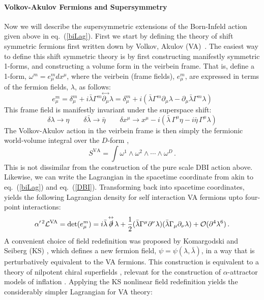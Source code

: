 \documentclass[11pt,letter]{article}
\def\eqn#1{eq.~(\ref{#1})}
\begin{document}
\paragraph{Volkov-Akulov Fermions and Supersymmetry}
Now we will describe the supersymmetric extensions of the Born-Infeld action given above in \eqn{biLag}. First we start by defining the theory of shift symmetric fermions first written down by Volkov, Akulov (VA)~\cite{Volkov:1973ix}. The easiest way to define this shift symmetric theory is by first constructing manifestly symmetric 1-forms, and constructing a volume form in the veirbein frame. That is, define a 1-form, $ \omega^m = e^m_\mu dx^\mu$, where the veirbein (frame fields), $e^m_\mu$, are expressed in terms of the fermion fields, $\lambda$, as follows:
 \begin{equation}
 e^m_\mu = \delta^m_\mu + i \bar{\lambda} \Gamma^m\! \stackrel{\leftrightarrow}{\partial_\mu}\!  \lambda = \delta^m_\mu + i (\bar{\lambda} \Gamma^m \partial_\mu  \lambda - \partial_\mu \bar{\lambda} \Gamma^m   \lambda)
 \end{equation}
 This frame field is manifestly invariant under the superspace shift:
\begin{equation}
\delta \lambda \rightarrow \eta \qquad  \delta \bar{\lambda} \rightarrow \bar{\eta} \qquad  \delta x^\mu \rightarrow x^\mu - i (\bar{\lambda} \,\Gamma^\mu \eta- i \bar{\eta} \,\Gamma^\mu \lambda)
\end{equation}
 The Volkov-Akulov action in the veirbein frame is then simply the fermionic world-volume integral over the $D$-form \cite{Kallosh:1997aw},
 \begin{equation}
 S^{\text{VA}} = \int \omega^1 \wedge \omega^2 \wedge \cdots \wedge \omega^D\,.
 \end{equation}
 This is not dissimilar from the construction of the pure scale DBI action above. Likewise, we can write the Lagrangian in the spacetime coordinate from akin to \eqn{biLag} and \eqn{DBI}. Transforming back into spacetime coordinates, yields the following Lagrangian density for self interaction VA fermions upto four-point interactions:
\begin{equation}
 \label{vaLag}
  \alpha'^{\,2}\mathcal{L}^{\text{VA}} = \text{det}(e^m_\mu) =  i\bar{\lambda}\!\stackrel{\leftrightarrow}{\slashed{\partial}}\!\lambda+ \frac{1}{2}(\bar{\lambda}\Gamma^\mu \partial^\nu \lambda)(\bar{\lambda}\Gamma_\mu \partial_\nu \lambda)+\mathcal{O}(\partial^4\lambda^6) 
  \,.
\end{equation}
 A convenient choice of field redefinition was proposed by Komargodski and Seiberg (KS) \cite{Komargodski:2009rz,Kuzenko:2010ef}, which defines a new fermion field, $\psi = \psi(\lambda,\bar{\lambda})$, in a way that is perturbatively equivalent to the VA fermions. This construction is equivalent to a theory of nilpotent chiral superfields \cite{Rocek:1978nb,Casalbuoni:1988xh,Ferrara:2014kva}, relevant for the construction of $\alpha$-attractor models of inflation \cite{Kallosh:2013yoa}. Applying the KS nonlinear field redefinition yields the considerably simpler Lagrangian for VA theory:
\end{document}
